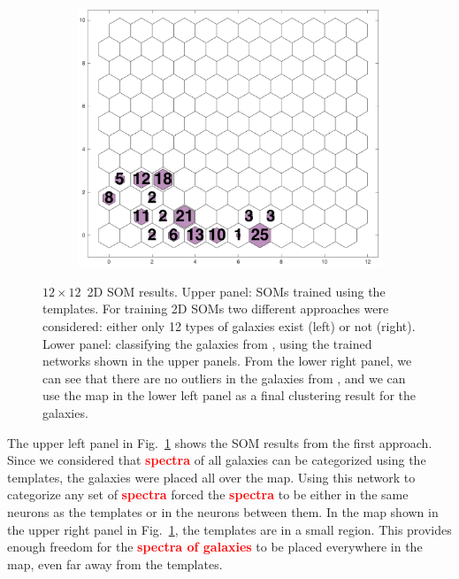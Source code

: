 \begin{figure}
\begin{subfigure}[b]{0.45\textwidth}
            \includegraphics[width=\textwidth]{images0.01/2d/hit_v_12_by_self_org_res12.png}
        \end{subfigure}
        \caption[$12\times12$ two-dimensional self-organizing map results]{$12\times12$~2D SOM results. Upper panel: SOMs trained using the \citet{Kinney96} templates. For training 2D SOMs two different approaches were considered: either only 12 types of galaxies exist (left) or not (right). Lower panel: classifying the galaxies from \citet{Hossein12}, using the trained networks shown in the upper panels. From the lower right panel, we can see that there are no outliers in the galaxies from , and we can use the map in the lower left panel as a final clustering result for the  galaxies.}
        \label{fig: 12by12}
    \end{figure}
    
    The upper left panel in Fig.~\ref{fig: 12by12} shows the SOM results from the first approach. 
    Since we considered that \textbf{\textcolor{red}{spectra}} of all galaxies can be categorized using the  templates, the galaxies were placed all over the map.
    Using this network to categorize any set of \textbf{\textcolor{red}{spectra}} forced the \textbf{\textcolor{red}{spectra}} to be either in the same neurons as the  templates or in the neurons between them.
    In the map shown in the upper right panel in Fig.~\ref{fig: 12by12}, the  templates are in a small region. This provides enough freedom for the \textbf{\textcolor{red}{spectra of galaxies}} to be placed everywhere in the map, even far away from the templates.
    
